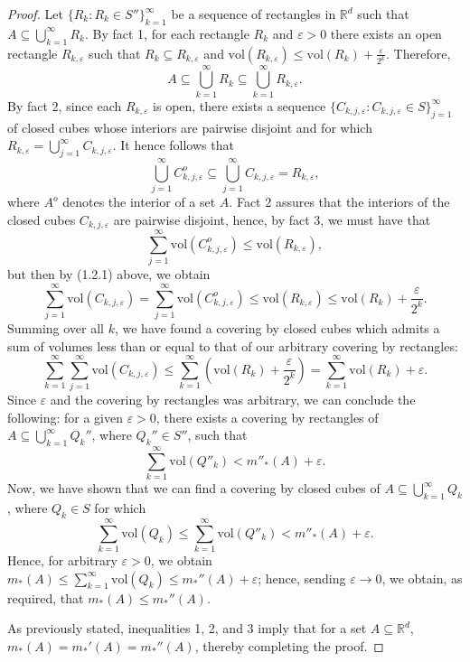 \begin{proof}
Let \( \{ R_k : R_k \in S'' \}_{k=1}^{\infty}  \) be a sequence of rectangles in \( \mathbb{R}^{d}  \) such that \(A \subseteq \bigcup_{k=1}^{\infty} R_k. \) By fact 1, for each rectangle \( R_k \) and \( \varepsilon >0  \) there exists an open rectangle \( R_{k ,\varepsilon }  \) such that \( R_k \subseteq R_{k, \varepsilon }  \) and \( \mbox{vol}(R_{k,\varepsilon } ) \leq \mbox{vol}(R_k) + \frac{\varepsilon }{2^{k} } 	 \). Therefore, \[A \subseteq \bigcup_{k=1}^{\infty} R_k \subseteq \bigcup_{k=1}^{\infty} R_{k,\varepsilon }.\] By fact 2, since each \( R_{k,\varepsilon }  \) is open, there exists a sequence \( \{ C_{k,j,\varepsilon }  : C_{k,j,\varepsilon }  \in S \}_{j=1}^{\infty}   \) of closed cubes whose interiors are pairwise disjoint and for which \( R_{k, \varepsilon } = \bigcup_{j=1}^{\infty} C_{k,j,\varepsilon } .\) It hence follows that \[ \bigcup_{j=1}^{\infty} C_{k,j,\varepsilon } ^{o} \subseteq \bigcup_{j=1}^{\infty} C_{k,j,\varepsilon } = R_{k,\varepsilon },   \] where \( A^{o}  \) denotes the interior of a set \( A \). Fact 2 assures that the interiors of the closed cubes \( C_{k,j,\varepsilon }  \) are pairwise disjoint, hence, by fact 3, we must have that \[\sum_{j=1}^{\infty}\mbox{vol}(C^{o}_{k,j,\varepsilon }  ) \leq \mbox{vol}(R_{k,\varepsilon } ) , \] but then by (1.2.1) above, we obtain \[\sum_{j=1}^{\infty}\mbox{vol}(C_{k,j,\varepsilon } ) =\sum_{j=1}^{\infty}\mbox{vol}(C^{o}_{k,j,\varepsilon }  ) \leq \mbox{vol}(R_{k,\varepsilon } ) \leq \mbox{vol}(R_k) + \frac{\varepsilon }{2^{k} } .\] Summing over all \( k \), we have found a covering by closed cubes which admits a sum of volumes less than or equal to that of our arbitrary covering by rectangles: \[\sum_{k=1}^{\infty} \sum_{j=1}^{\infty}\mbox{vol}(C_{k,j,\varepsilon } ) \leq \sum_{k=1}^{\infty}\left ( {\mbox{vol}(R_k) + \frac{\varepsilon }{2^{k} } } \right ) = \sum_{k=1}^{\infty}\mbox{vol}(R_k) + \varepsilon . \]  
Since \( \varepsilon  \) and the covering by rectangles was arbitrary, we can conclude the following: for a given \( \varepsilon > 0 \), there exists a covering by rectangles of \( A \subseteq \bigcup_{k=1}^{\infty} Q_{k} '' \), where \( Q_k'' \in S'' \), such that \[ \sum_{k=1}^{\infty} \mbox{vol}(Q''_k) < m''_*(A) + \varepsilon. \] Now, we have shown that we can find a covering by closed cubes of \( A \subseteq \bigcup_{k=1}^{\infty} Q_k \), where \( Q_k \in S \) for which \[\sum_{k=1}^{\infty} \mbox{vol}(Q_k) \leq \sum_{k=1}^{\infty}\mbox{vol}(Q''_k) < m''_*(A) + \varepsilon . \] Hence, for arbitrary \( \varepsilon >0 \), we obtain \(m_*(A) \leq \sum_{k=1}^{\infty}\mbox{vol}(Q_k) 	  \leq m_*''(A)+\varepsilon \); hence, sending \( \varepsilon \to 0 \), we obtain, as required, that \( m_*(A) \leq m_*''(A) \).

As previously stated, inequalities 1, 2, and 3 imply that for a set \( A \subseteq \mathbb{R}^{d}  \), \( m_*(A) = m_*'(A) = m_*''(A) \), thereby completing the proof.
\end{proof}
